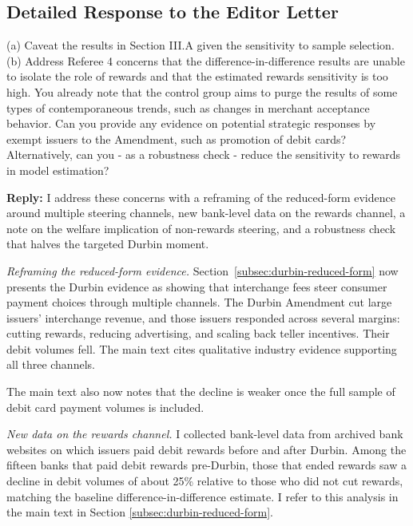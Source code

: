 \documentclass[main.tex]{subfiles}
\begin{document}
\begin{refsection}
\section*{Detailed Response to the Editor Letter}

\begin{refcommentnoclear}
(a) Caveat the results in Section III.A given the sensitivity to sample selection.
(b) Address Referee 4 concerns that the difference-in-difference results are unable to isolate the role of rewards and that the estimated rewards sensitivity is too high.
You already note that the control group aims to purge the results of some types of contemporaneous trends, such as changes in merchant acceptance behavior.
Can you provide any evidence on potential strategic responses by exempt issuers to the Amendment, such as promotion of debit cards?
Alternatively, can you - as a robustness check - reduce the sensitivity to rewards in model estimation?

\end{refcommentnoclear}
\textbf{Reply:} I address these concerns with a reframing of the reduced-form evidence around multiple steering channels, new bank-level data on the rewards channel, a note on the welfare implication of non-rewards steering, and a robustness check that halves the targeted Durbin moment.

\emph{Reframing the reduced-form evidence.}
Section~\ref{subsec:durbin-reduced-form} now presents the Durbin evidence as showing that interchange fees steer consumer payment choices through multiple channels.
The Durbin Amendment cut large issuers' interchange revenue, and those issuers responded across several margins: cutting rewards, reducing advertising, and scaling back teller incentives.
Their debit volumes fell.
The main text cites qualitative industry evidence supporting all three channels. 

The main text also now notes that the decline is weaker once the full sample of debit card payment volumes is included.

\emph{New data on the rewards channel.}
I collected bank-level data from archived bank websites on which issuers paid debit rewards before and after Durbin.
Among the fifteen banks that paid debit rewards pre-Durbin, those that ended rewards saw a decline in debit volumes of about 25\% relative to those who did not cut rewards, matching the baseline difference-in-difference estimate.
I refer to this analysis in the main text in Section \ref{subsec:durbin-reduced-form}.


\end{refsection}
\end{document}
